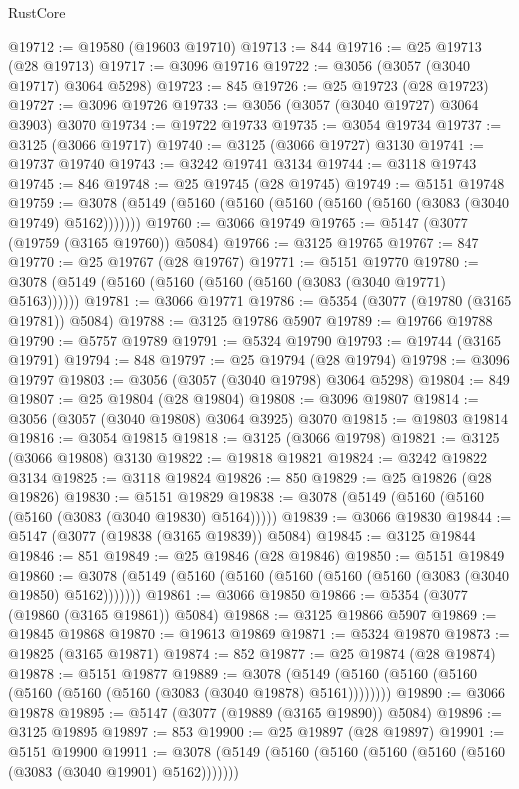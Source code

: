 \begin{lexlean}{RustCore}
\begin{coremodule}
@19712 := @19580 (@19603 @19710)
@19713 := 844
@19716 := @25 @19713 (@28 @19713)
@19717 := @3096 @19716
@19722 := @3056 (@3057 (@3040 @19717) @3064 @5298)
@19723 := 845
@19726 := @25 @19723 (@28 @19723)
@19727 := @3096 @19726
@19733 := @3056 (@3057 (@3040 @19727) @3064 @3903) @3070
@19734 := @19722 @19733
@19735 := @3054 @19734
@19737 := @3125 (@3066 @19717)
@19740 := @3125 (@3066 @19727) @3130
@19741 := @19737 @19740
@19743 := @3242 @19741 @3134
@19744 := @3118 @19743
@19745 := 846
@19748 := @25 @19745 (@28 @19745)
@19749 := @5151 @19748
@19759 := @3078 (@5149 (@5160 (@5160 (@5160 (@5160 (@5160 (@3083 (@3040 @19749) @5162)))))))
@19760 := @3066 @19749
@19765 := @5147 (@3077 (@19759 (@3165 @19760)) @5084)
@19766 := @3125 @19765
@19767 := 847
@19770 := @25 @19767 (@28 @19767)
@19771 := @5151 @19770
@19780 := @3078 (@5149 (@5160 (@5160 (@5160 (@5160 (@3083 (@3040 @19771) @5163))))))
@19781 := @3066 @19771
@19786 := @5354 (@3077 (@19780 (@3165 @19781)) @5084)
@19788 := @3125 @19786 @5907
@19789 := @19766 @19788
@19790 := @5757 @19789
@19791 := @5324 @19790
@19793 := @19744 (@3165 @19791)
@19794 := 848
@19797 := @25 @19794 (@28 @19794)
@19798 := @3096 @19797
@19803 := @3056 (@3057 (@3040 @19798) @3064 @5298)
@19804 := 849
@19807 := @25 @19804 (@28 @19804)
@19808 := @3096 @19807
@19814 := @3056 (@3057 (@3040 @19808) @3064 @3925) @3070
@19815 := @19803 @19814
@19816 := @3054 @19815
@19818 := @3125 (@3066 @19798)
@19821 := @3125 (@3066 @19808) @3130
@19822 := @19818 @19821
@19824 := @3242 @19822 @3134
@19825 := @3118 @19824
@19826 := 850
@19829 := @25 @19826 (@28 @19826)
@19830 := @5151 @19829
@19838 := @3078 (@5149 (@5160 (@5160 (@5160 (@3083 (@3040 @19830) @5164)))))
@19839 := @3066 @19830
@19844 := @5147 (@3077 (@19838 (@3165 @19839)) @5084)
@19845 := @3125 @19844
@19846 := 851
@19849 := @25 @19846 (@28 @19846)
@19850 := @5151 @19849
@19860 := @3078 (@5149 (@5160 (@5160 (@5160 (@5160 (@5160 (@3083 (@3040 @19850) @5162)))))))
@19861 := @3066 @19850
@19866 := @5354 (@3077 (@19860 (@3165 @19861)) @5084)
@19868 := @3125 @19866 @5907
@19869 := @19845 @19868
@19870 := @19613 @19869
@19871 := @5324 @19870
@19873 := @19825 (@3165 @19871)
@19874 := 852
@19877 := @25 @19874 (@28 @19874)
@19878 := @5151 @19877
@19889 := @3078 (@5149 (@5160 (@5160 (@5160 (@5160 (@5160 (@5160 (@3083 (@3040 @19878) @5161))))))))
@19890 := @3066 @19878
@19895 := @5147 (@3077 (@19889 (@3165 @19890)) @5084)
@19896 := @3125 @19895
@19897 := 853
@19900 := @25 @19897 (@28 @19897)
@19901 := @5151 @19900
@19911 := @3078 (@5149 (@5160 (@5160 (@5160 (@5160 (@5160 (@3083 (@3040 @19901) @5162)))))))

\end{coremodule}
\end{lexlean}
